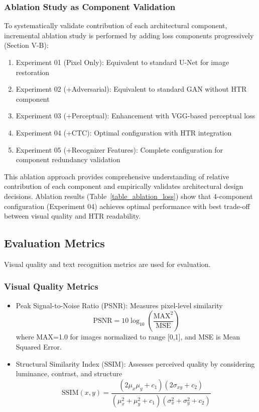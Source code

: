 \documentclass[journal]{IEEEtran}
\begin{document}
\subsubsection{Ablation Study as Component Validation}

To systematically validate contribution of each architectural component, incremental ablation study is performed by adding loss components progressively (Section V-B):

\begin{enumerate}[label=(\alph*)]
    \item Experiment 01 (Pixel Only): Equivalent to standard U-Net for image restoration
    \item Experiment 02 (+Adversarial): Equivalent to standard GAN without HTR component
    \item Experiment 03 (+Perceptual): Enhancement with VGG-based perceptual loss
    \item Experiment 04 (+CTC): Optimal configuration with HTR integration
    \item Experiment 05 (+Recognizer Features): Complete configuration for component redundancy validation
\end{enumerate}

This ablation approach provides comprehensive understanding of relative contribution of each component and empirically validates architectural design decisions. Ablation results (Table~\ref{table_ablation_loss}) show that 4-component configuration (Experiment 04) achieves optimal performance with best trade-off between visual quality and HTR readability.

\subsection{Evaluation Metrics}

Visual quality and text recognition metrics are used for evaluation.

\subsubsection{Visual Quality Metrics}

\begin{itemize}
    \item Peak Signal-to-Noise Ratio (PSNR): Measures pixel-level similarity
    \begin{equation}
    \text{PSNR} = 10 \log_{10}\left(\frac{\text{MAX}^2}{\text{MSE}}\right)
    \end{equation}
    where MAX=1.0 for images normalized to range [0,1], and MSE is Mean Squared Error.

    \item Structural Similarity Index (SSIM): Assesses perceived quality by considering luminance, contrast, and structure~\cite{wang2004ssim}
    \begin{equation}
    \text{SSIM}(x,y) = \frac{(2\mu_x\mu_y + c_1)(2\sigma_{xy} + c_2)}{(\mu_x^2 + \mu_y^2 + c_1)(\sigma_x^2 + \sigma_y^2 + c_2)}
    \end{equation}
\end{itemize}
\end{document}
